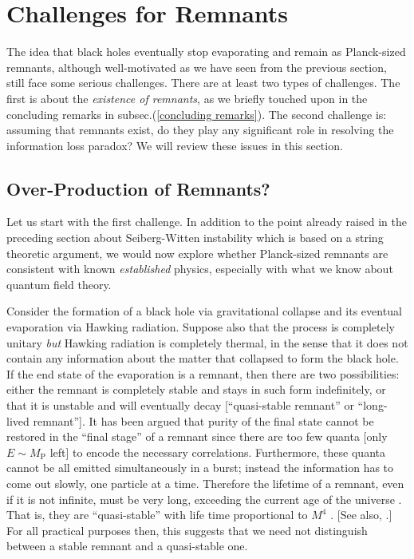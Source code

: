 \documentclass[12pt]{article}
\newcommand{\2}{$^2$}
\newcommand{\3}{$^3$}
\newcommand{\4}{$_4$}
\newcommand{\5}{$_5$}
\begin{document}
\section{Challenges for Remnants}\label{challenges}

The idea that black holes eventually stop evaporating and remain as Planck-sized remnants, although well-motivated as we have seen from the previous section, still face some serious challenges. There are at least two types of challenges. The first is about the \emph{existence of remnants}, as we briefly touched upon in the concluding remarks in subsec.(\ref{concluding remarks}). The second challenge is: assuming that remnants exist, do they play any significant role in resolving the information loss paradox? We will review these issues in this section. 

\subsection{Over-Production of Remnants?}\label{overproduce}


Let us start with the first challenge. In addition to the point already raised in the preceding section about Seiberg-Witten instability which is based on a string theoretic argument, we would now explore whether Planck-sized remnants are consistent with known \emph{established} physics, especially with what we know about quantum field theory.

Consider the formation of a black hole via gravitational collapse and its eventual evaporation via Hawking radiation. Suppose also that the process is completely unitary \emph{but} Hawking radiation is completely thermal, in the sense that it does not contain any information about the matter that collapsed to form the black hole. If the end state of the evaporation is a remnant, then there are two possibilities: either the remnant is completely stable and stays in such form indefinitely, or that it is unstable and will eventually decay [``quasi-stable remnant'' or ``long-lived remnant'']. It has been argued that purity of the final state cannot be restored in the ``final stage'' of a remnant since there are too few quanta [only $E \sim M_\text{P}$ left] to encode the necessary correlations. Furthermore,
these quanta cannot be all emitted simultaneously in a burst; instead the information has to come out slowly, one particle at a time.
Therefore the lifetime of a remnant, even if it is not infinite, must be very long, exceeding the current age of the universe \cite{ACN}. That is, they are ``quasi-stable'' with life time proportional to $M^4$ \cite{preskill}. [See also, \cite{Giddings1, CW}.] For all practical purposes then, this suggests that we need not distinguish between a stable remnant and a quasi-stable one. 
\end{document}
